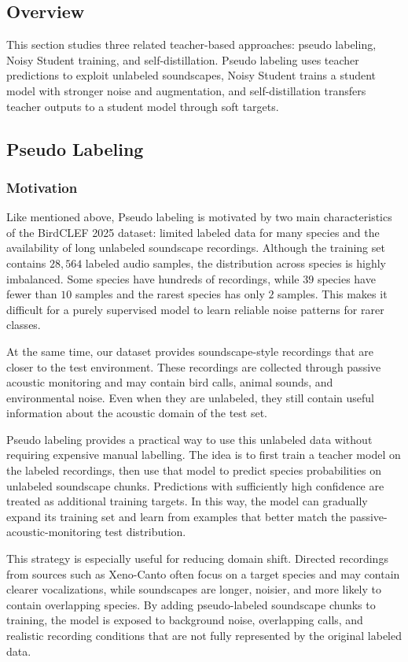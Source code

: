 \documentclass[a4paper,12pt]{article}
\begin{document}
\subsection{Overview}
This section studies three related teacher-based approaches: pseudo labeling, Noisy Student training, and self-distillation. Pseudo labeling uses teacher predictions to exploit unlabeled soundscapes, Noisy Student trains a student model with stronger noise and augmentation, and self-distillation transfers teacher outputs to a student model through soft targets.

\subsection{Pseudo Labeling}
\subsubsection{Motivation}


Like mentioned above, Pseudo labeling is motivated by two main characteristics of the BirdCLEF 2025 dataset: limited labeled data for many species and the availability of long unlabeled soundscape recordings. Although the training set contains $28{,}564$ labeled audio samples, the distribution across species is highly imbalanced. Some species have hundreds of recordings, while $39$ species have fewer than $10$ samples and the rarest species has only $2$ samples. This makes it difficult for a purely supervised model to learn reliable noise patterns for rarer classes.

At the same time, our dataset provides soundscape-style recordings that are closer to the test environment. These recordings are collected through passive acoustic monitoring and may contain bird calls, animal sounds, and environmental noise. Even when they are unlabeled, they still contain useful information about the acoustic domain of the test set.

Pseudo labeling provides a practical way to use this unlabeled data without requiring expensive manual labelling. The idea is to first train a teacher model on the labeled recordings, then use that model to predict species probabilities on unlabeled soundscape chunks. Predictions with sufficiently high confidence are treated as additional training targets. In this way, the model can gradually expand its training set and learn from examples that better match the passive-acoustic-monitoring test distribution.

This strategy is especially useful for reducing domain shift. Directed recordings from sources such as Xeno-Canto often focus on a target species and may contain clearer vocalizations, while soundscapes are longer, noisier, and more likely to contain overlapping species. By adding pseudo-labeled soundscape chunks to training, the model is exposed to background noise, overlapping calls, and realistic recording conditions that are not fully represented by the original labeled data.
\end{document}
